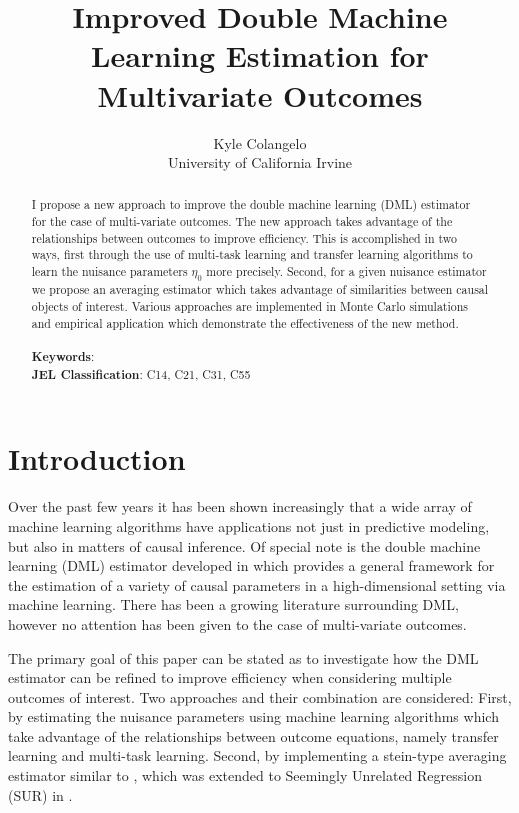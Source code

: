 \documentclass[12pt]{article}
\title{Improved Double Machine Learning Estimation for Multivariate Outcomes}
\author{Kyle Colangelo\\University of California Irvine}
\begin{document}
\maketitle
\begin{abstract}
	I propose a new approach to improve the double machine learning (DML) estimator for the case of multi-variate outcomes. The new approach takes advantage of the relationships between outcomes to improve efficiency. This is accomplished in two ways, first through the use of multi-task learning and transfer learning algorithms to learn the nuisance parameters $\eta_0$ more precisely. Second, for a given nuisance estimator we propose an averaging estimator which takes advantage of similarities between causal objects of interest. Various approaches are implemented in Monte Carlo simulations and empirical application which demonstrate the effectiveness of the new method. 
	\\
	\\
	\textbf{Keywords}: 
	\\
	\textbf{JEL Classification}: C14, C21, C31, C55
\end{abstract}

\newpage
\section{Introduction}
	 Over the past few years it has been shown increasingly that a wide array of machine learning algorithms have applications not just in predictive modeling, but also in matters of causal inference. Of special note is the double machine learning (DML) estimator developed in \cite{chernozhukov2018double} which provides a general framework for the estimation of a variety of causal parameters in a high-dimensional setting via machine learning. There has been a growing literature surrounding DML, however no attention has been given to the case of multi-variate outcomes. 
	 
	The primary goal of this paper can be stated as to investigate how the DML estimator can be refined to improve efficiency when considering multiple outcomes of interest. Two approaches and their combination are considered: First, by estimating the nuisance parameters using machine learning algorithms which take advantage of the relationships between outcome equations, namely transfer learning and multi-task learning. Second, by implementing a stein-type averaging estimator similar to \cite{hansen2016efficient}, which was extended to Seemingly Unrelated Regression (SUR) in \cite{mehrabani2020improved}.
	
\end{document}
